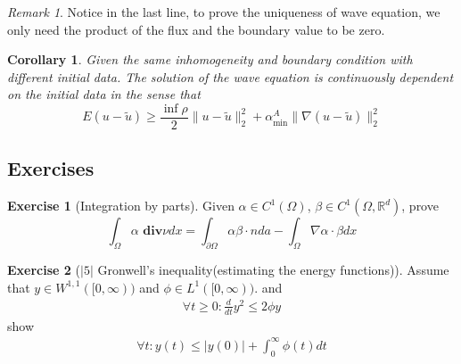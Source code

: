 \documentclass[a4paper,11pt,oneside,fleqn]{book}
\newtheorem{corollary}{Corollary}[theorem]
\theoremstyle{definition}
\newtheorem{exercise}{Exercise}[chapter]
\theoremstyle{remark}
\newtheorem*{remark}{Remark}
\begin{document}
\begin{remark}
Notice in the last line, to prove the uniqueness of wave equation, we only need the product of the flux and the boundary value to be zero. 	
\end{remark}


\begin{corollary}
	Given the same inhomogeneity and boundary condition with different initial data. The solution of the wave equation is continuously dependent on the initial data in the sense that
	\begin{equation}
		E(u - \tilde{u}) \geq \frac{\inf \rho}{2} \|u - \tilde{u}\|_2^2 + \alpha_{\min}^A \|\nabla (u - \tilde{u})\|_2^2
	\end{equation}
\end{corollary}



\subsection{Exercises}
\begin{exercise}[Integration by parts]
	Given $\alpha \in C^1(\Omega)$, $\beta \in C^1(\Omega, \mathbb{R}^d)$, 
	prove
\begin{equation*}
	\int_\Omega \alpha \textbf{ div}\nu dx = \int_{\partial \Omega} \alpha \beta \cdot n da  -\int_\Omega \nabla \alpha \cdot  \beta dx
\end{equation*}
\end{exercise}

\begin{exercise}[$|5|$ Gronwell's inequality(estimating the energy functions)]
Assume that $y \in W^{1, 1}([0, \infty))$ and $\phi \in L^1([0, \infty))$. and 
\begin{align*}
	\forall t \geq 0: \frac{d}{dt} y^2 \leq 2 \phi y 
\end{align*}
show
\begin{align*}
	\forall t : y(t) \leq |y(0)| + \int_0^\infty \phi(t) dt
\end{align*}
	
\end{exercise}
\end{document}
